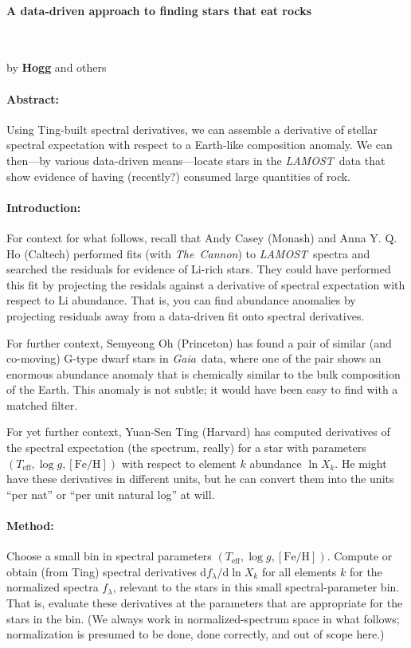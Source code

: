 \documentclass[12pt]{article}
\newcommand{\project}[1]{\textsl{#1}}
\newcommand{\acronym}[1]{{\small{#1}}}
\newcommand{\LAMOST}{\project{\acronym{LAMOST}}}
\newcommand{\TheCannon}{\project{The~Cannon}}
\newcommand{\Gaia}{\project{Gaia}}
\newcommand{\dd}{\mathrm{d}}
\newcommand{\teff}{T_{\mathrm{eff}}}
\newcommand{\logg}{\log g}
\newcommand{\feh}{[\mathrm{Fe}/\mathrm{H}]}
\begin{document}
\raggedbottom\sloppy\sloppypar\frenchspacing

\paragraph{A data-driven approach to finding stars that eat rocks}
~

\noindent
by \textbf{Hogg} and others

\paragraph{Abstract:}
Using Ting-built spectral derivatives,
we can assemble a derivative of stellar spectral expectation with respect
to a Earth-like composition anomaly.
We can then---by various data-driven means---locate stars in the
\LAMOST\ data that show evidence of having (recently?) consumed
large quantities of rock.

\paragraph{Introduction:}
For context for what follows, recall that Andy Casey (Monash) and Anna
Y. Q. Ho (Caltech) performed fits (with \TheCannon) to
\LAMOST\ spectra and searched the residuals for evidence of
Li-rich stars.
They could have performed this fit by projecting the
residals against a derivative of spectral expectation with respect
to Li abundance.
That is, you can find abundance anomalies by projecting residuals away
from a data-driven fit onto spectral derivatives.

For further context, Semyeong Oh (Princeton) has found a pair of similar
(and co-moving) G-type dwarf stars in \Gaia\ data, where one of the pair
shows an enormous abundance anomaly that is chemically similar to the
bulk composition of the Earth.
This anomaly is not subtle; it would have been easy to find with a matched
filter.

For yet further context, Yuan-Sen Ting (Harvard) has computed derivatives
of the spectral expectation (the spectrum, really) for a star with parameters
$(\teff, \logg, \feh)$ with respect to element $k$ abundance $\ln X_k$.
He might have these derivatives in different units, but he can convert them
into the units ``per nat'' or ``per unit natural log'' at will.

\paragraph{Method:}
Choose a small bin in spectral parameters $(\teff, \logg, \feh)$.
Compute or obtain (from Ting) spectral derivatives $\dd f_\lambda/\dd\ln X_k$ for
all elements $k$ for the normalized spectra $f_\lambda$, relevant
to the stars in this small spectral-parameter bin.
That is, evaluate these derivatives at the parameters that are
appropriate for the stars in the bin.
(We always work in normalized-spectrum space in what follows; normalization
is presumed to be done, done correctly, and out of scope here.)
\end{document}
